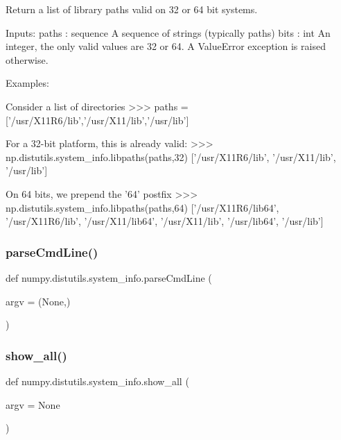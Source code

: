 \begin{DoxyVerb}Return a list of library paths valid on 32 or 64 bit systems.

Inputs:
  paths : sequence
    A sequence of strings (typically paths)
  bits : int
    An integer, the only valid values are 32 or 64.  A ValueError exception
  is raised otherwise.

Examples:

Consider a list of directories
>>> paths = ['/usr/X11R6/lib','/usr/X11/lib','/usr/lib']

For a 32-bit platform, this is already valid:
>>> np.distutils.system_info.libpaths(paths,32)
['/usr/X11R6/lib', '/usr/X11/lib', '/usr/lib']

On 64 bits, we prepend the '64' postfix
>>> np.distutils.system_info.libpaths(paths,64)
['/usr/X11R6/lib64', '/usr/X11R6/lib', '/usr/X11/lib64', '/usr/X11/lib',
'/usr/lib64', '/usr/lib']
\end{DoxyVerb}
 \mbox{\label{namespacenumpy_1_1distutils_1_1system__info_ab55940fc54600e522e68f0563b132782}} 
\subsubsection{\texorpdfstring{parse\+Cmd\+Line()}{parseCmdLine()}}
{\footnotesize\ttfamily def numpy.\+distutils.\+system\+\_\+info.\+parse\+Cmd\+Line (\begin{DoxyParamCaption}\item[{}]{argv = {\ttfamily (None,)} }\end{DoxyParamCaption})}

\mbox{\label{namespacenumpy_1_1distutils_1_1system__info_a55f5263f3882b0c59bf4c7fbc823e603}} 
\subsubsection{\texorpdfstring{show\+\_\+all()}{show\_all()}}
{\footnotesize\ttfamily def numpy.\+distutils.\+system\+\_\+info.\+show\+\_\+all (\begin{DoxyParamCaption}\item[{}]{argv = {\ttfamily None} }\end{DoxyParamCaption})}



